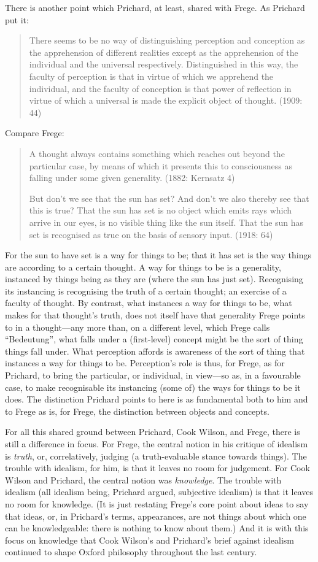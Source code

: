 There is another point which Prichard, at least, shared with Frege. As Prichard put it:
\begin{quote}
	There seems to be no way of distinguishing perception and conception as the apprehension of different realities except as the apprehension of the individual and the universal respectively. Distinguished in this way, the faculty of perception is that in virtue of which we apprehend the individual, and the faculty of conception is that power of reflection in virtue of which a universal is made the explicit object of thought. (1909: 44)
\end{quote}
Compare Frege:
\begin{quote}
	\noindent A thought always contains something which reaches out beyond the particular case, by means of which it presents this to consciousness as falling under some given generality. (1882: Kernsatz 4)
	
	\noindent But don’t we see that the sun has set? And don’t we also thereby see that this is true? That the sun has set is no object which emits rays which arrive in our eyes, is no visible thing like the sun itself. That the sun has set is recognised as true on the basis of sensory input. (1918: 64)
\end{quote}
For the sun to have set is a way for things to be; that it has set is the way things are according to a certain thought. A way for things to be is a generality, instanced by things being as they are (where the sun has just set). Recognising its instancing is recognising the truth of a certain thought; an exercise of a faculty of thought. By contrast, what instances a way for things to be, what makes for that thought's truth, does not itself have that generality Frege points to in a thought---any more than, on a different level, which Frege calls ``Bedeutung'', what falls under a (first-level) concept might be the sort of thing things fall under. What perception affords is awareness of the sort of thing that instances a way for things to be. Perception's role is thus, for Frege, as for Prichard, to bring the particular, or individual, in view---so as, in a favourable case, to make recognisable its instancing (some of) the ways for things to be it does. The distinction Prichard points to here is as fundamental both to him and to Frege as is, for Frege, the distinction between objects and concepts.

For all this shared ground between Prichard, Cook Wilson, and Frege, there is still a difference in focus. For Frege, the central notion in his critique of idealism is \emph{truth}, or, correlatively, judging (a truth-evaluable stance towards things). The trouble with idealism, for him, is that it leaves no room for judgement. For Cook Wilson and Prichard, the central notion was \emph{knowledge}. The trouble with idealism (all idealism being, Prichard argued, subjective idealism) is that it leaves no room for knowledge. (It is just restating Frege's core point about ideas to say that ideas, or, in Prichard’s terms, appearances, are not things about which one can be knowledgeable: there is nothing to know about them.) And it is with this focus on knowledge that Cook Wilson’s and Prichard’s brief against idealism continued to shape Oxford philosophy throughout the last century.

